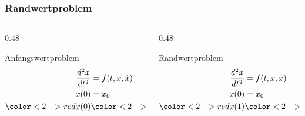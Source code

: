 \begin{frame}
\frametitle{Randwertproblem}
\vspace{-15pt}
\begin{columns}[t]
\begin{column}{0.48\hsize}
\begin{block}{Anfangswertproblem}
\vspace{-10pt}
\begin{align*}
\frac{d^2x}{dt^2}
&=
f(t,x,\dot{x})
\\
x(0)&=x_0
\\
{\color<2->{red}\dot{x}(0)}&{\color<2->{red}=v_0}
\end{align*}
\end{block}
\vspace{-25pt}
\begin{center}
\graphik
\end{center}
\end{column}
\begin{column}{0.48\hsize}
\begin{block}{Randwertproblem}
\vspace{-10pt}
\begin{align*}
\frac{d^2x}{dt^2}
&=
f(t,x,\dot{x})
\\
x(0)&=x_0
\\
{\color<2->{red}x(1)}&{\color<2->{red}=x_1}
\end{align*}
\end{block}
\vspace{-25pt}
\begin{center}
\graphik
\end{center}
\end{column}
\end{columns}
\end{frame}


\egroup
